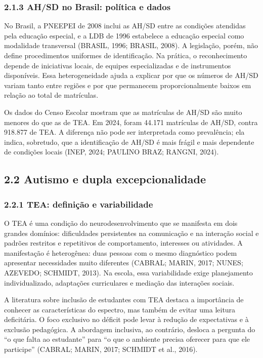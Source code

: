 \subsubsection{2.1.3 AH/SD no Brasil: política e
dados}\label{ahsd-no-brasil-poluxedtica-e-dados}

No Brasil, a PNEEPEI de 2008 inclui as AH/SD entre as condições
atendidas pela educação especial, e a LDB de 1996 estabelece a educação
especial como modalidade transversal (BRASIL, 1996; BRASIL, 2008). A
legislação, porém, não define procedimentos uniformes de identificação.
Na prática, o reconhecimento depende de iniciativas locais, de equipes
especializadas e de instrumentos disponíveis. Essa heterogeneidade ajuda
a explicar por que os números de AH/SD variam tanto entre regiões e por
que permanecem proporcionalmente baixos em relação ao total de
matrículas.

Os dados do Censo Escolar mostram que as matrículas de AH/SD são muito
menores do que as de TEA. Em 2024, foram 44.171 matrículas de AH/SD,
contra 918.877 de TEA. A diferença não pode ser interpretada como
prevalência; ela indica, sobretudo, que a identificação de AH/SD é mais
frágil e mais dependente de condições locais (INEP, 2024; PAULINO BRAZ;
RANGNI, 2024).

\subsection{2.2 Autismo e dupla
excepcionalidade}\label{autismo-e-dupla-excepcionalidade}

\subsubsection{2.2.1 TEA: definição e
variabilidade}\label{tea-definiuxe7uxe3o-e-variabilidade}

O TEA é uma condição do neurodesenvolvimento que se manifesta em dois
grandes domínios: dificuldades persistentes na comunicação e na
interação social e padrões restritos e repetitivos de comportamento,
interesses ou atividades. A manifestação é heterogênea: duas pessoas com
o mesmo diagnóstico podem apresentar necessidades muito diferentes
(CABRAL; MARIN, 2017; NUNES; AZEVEDO; SCHMIDT, 2013). Na escola, essa
variabilidade exige planejamento individualizado, adaptações
curriculares e mediação das interações sociais.

A literatura sobre inclusão de estudantes com TEA destaca a importância
de conhecer as características do espectro, mas também de evitar uma
leitura deficitária. O foco exclusivo no déficit pode levar à redução de
expectativas e à exclusão pedagógica. A abordagem inclusiva, ao
contrário, desloca a pergunta do ``o que falta ao estudante'' para ``o
que o ambiente precisa oferecer para que ele participe'' (CABRAL; MARIN,
2017; SCHMIDT et al., 2016).

